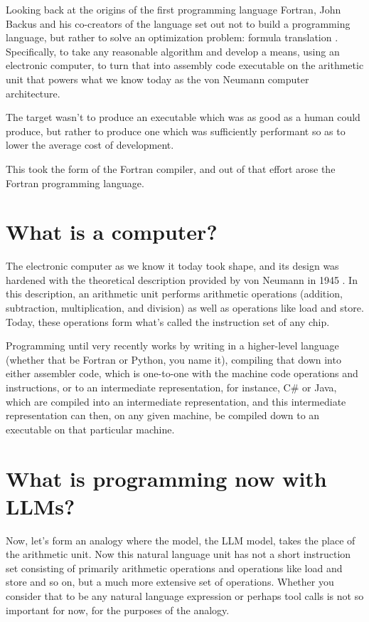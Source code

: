 \documentclass[12pt]{extarticle}
\begin{document}
Looking back at the origins of the first programming language Fortran, John Backus and his co-creators of the language set out not to build a programming language, but rather to solve an optimization problem: formula translation \cite{backus1957}. Specifically, to take any reasonable algorithm and develop a means, using an electronic computer, to turn that into assembly code executable on the arithmetic unit that powers what we know today as the von Neumann computer architecture.

The target wasn't to produce an executable which was as good as a human could produce, but rather to produce one which was sufficiently performant so as to lower the average cost of development.

This took the form of the Fortran compiler, and out of that effort arose the Fortran programming language.

\section{What is a computer?}

The electronic computer as we know it today took shape, and its design was hardened with the theoretical description provided by von Neumann in 1945 \cite{vonneumann1945}. In this description, an arithmetic unit performs arithmetic operations (addition, subtraction, multiplication, and division) as well as operations like load and store. Today, these operations form what's called the instruction set of any chip.

Programming until very recently works by writing in a higher-level language (whether that be Fortran or Python, you name it), compiling that down into either assembler code, which is one-to-one with the machine code operations and instructions, or to an intermediate representation, for instance, C\# or Java, which are compiled into an intermediate representation, and this intermediate representation can then, on any given machine, be compiled down to an executable on that particular machine.

\section{What is programming now with LLMs?}

Now, let's form an analogy where the model, the LLM model, takes the place of the arithmetic unit. Now this natural language unit has not a short instruction set consisting of primarily arithmetic operations and operations like load and store and so on, but a much more extensive set of operations. Whether you consider that to be any natural language expression or perhaps tool calls is not so important for now, for the purposes of the analogy.
\end{document}
